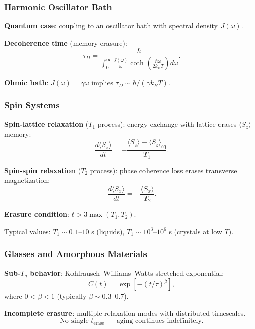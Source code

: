 \documentclass[11pt]{article}
\theoremstyle{defstyle}
\theoremstyle{mapstyle}
\begin{document}
\subsubsection{Harmonic Oscillator Bath}

\textbf{Quantum case}: coupling to an oscillator bath with spectral density $J(\omega)$.

\textbf{Decoherence time} (memory erasure):
\begin{equation}
\boxed{\tau_D = \frac{\hbar}{\int_0^\infty \frac{J(\omega)}{\omega}
\coth\!\left(\frac{\hbar\omega}{2k_B T}\right) d\omega}.}
\end{equation}

\textbf{Ohmic bath}: $J(\omega)=\gamma\omega$ implies $\tau_D \sim \hbar/(\gamma k_B T)$.

\subsubsection{Spin Systems}

\textbf{Spin-lattice relaxation} ($T_1$ process): energy exchange with lattice erases $\langle S_z \rangle$ memory:
\begin{equation}
\frac{d\langle S_z \rangle}{dt} = -\frac{\langle S_z \rangle - \langle S_z \rangle_{\text{eq}}}{T_1}.
\end{equation}

\textbf{Spin-spin relaxation} ($T_2$ process): phase coherence loss erases transverse magnetization:
\begin{equation}
\frac{d\langle S_x \rangle}{dt} = -\frac{\langle S_x \rangle}{T_2}.
\end{equation}

\textbf{Erasure condition}: $t > 3 \max(T_1, T_2)$.

Typical values: $T_1 \sim 0.1$--$10$ s (liquids), $T_1 \sim 10^{3}$--$10^{6}$ s (crystals at low $T$).

\subsubsection{Glasses and Amorphous Materials}

\textbf{Sub-$T_g$ behavior}: Kohlrausch--Williams--Watts stretched exponential:
\begin{equation}
C(t) = \exp\!\left[-(t/\tau)^\beta\right],
\end{equation}
where $0<\beta<1$ (typically $\beta \sim 0.3$--$0.7$).

\textbf{Incomplete erasure}: multiple relaxation modes with distributed timescales.
\begin{equation}
\boxed{\text{No single } t_{\text{erase}} \text{ --- aging continues indefinitely.}}
\end{equation}
\end{document}
